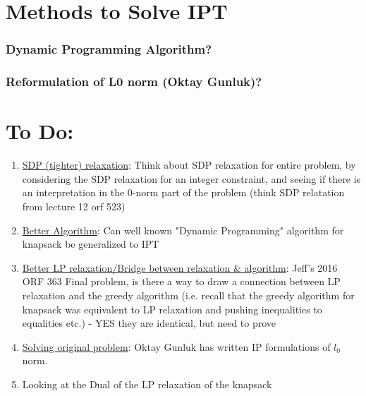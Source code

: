 \documentclass[12pt]{article}
\begin{document}
\section{Methods to Solve \gls{IPT}}
\subsubsection{Dynamic Programming Algorithm?}
\subsubsection{Reformulation of L0 norm (Oktay Gunluk)?}
\section*{To Do:}
\begin{enumerate}
    \item \underline{SDP (tighter) relaxation}: Think about SDP relaxation for entire problem, by considering the SDP relaxation for an integer constraint, and seeing if there is an interpretation in the 0-norm part of the problem (think SDP relatation from lecture 12 orf 523)
    \item \underline{Better Algorithm}: Can well known "Dynamic Programming" algorithm for knapsack be generalized to \gls{IPT}
    \item \underline{Better LP relaxation/Bridge between relaxation \& algorithm}: Jeff's 2016 ORF 363 Final problem, is there a way to draw a connection between LP relaxation and the greedy algorithm (i.e. recall that the greedy algorithm for knapsack was equivalent to LP relaxation and pushing inequalities to equalities etc.) - YES they are identical, but need to prove
    \item \underline{Solving original problem}: Oktay Gunluk has written IP formulations of $l_0$ norm.
    \item Looking at the Dual of the LP relaxation of the knapsack
\end{enumerate}


\end{document}
